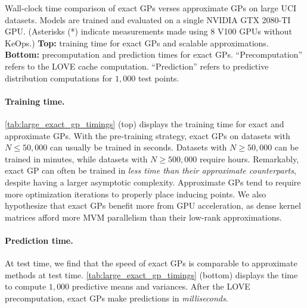 
\begin{table}[t!]
  \vspace{1em}
  \caption[Wall-clock time of exact GPs verse approximate GPs.]{
    Wall-clock time comparison of exact GPs verses approximate GPs on large UCI datasets.
    Models are trained and evaluated on a single NVIDIA GTX 2080-TI GPU.
    (Asterisks (*) indicate measurements made using 8 V100 GPUs without KeOps.)
    {\bf Top:} training time for exact GPs and scalable approximations.
    {\bf Bottom:} precomputation and prediction times for exact GPs.
    ``Precomputation'' refers to the LOVE cache computation.
    ``Prediction'' refers to predictive distribution computations for $1,\!000$ test points.
  }
  \label{tab:large_exact_gp_timings}
  \centering
  \vspace{1em}

  \resizebox{\textwidth}{!}{%
    
  }
  \vspace{1em}

  \resizebox{\textwidth}{!}{%
    
  }

  \vspace{2em}
\end{table}


\paragraph{Training time.}
\cref{tab:large_exact_gp_timings} (top) displays the training time for exact and approximate GPs.
With the pre-training strategy, exact GPs on datasets with $N \leq 50,\!000$ can usually be trained in seconds.
Datasets with $N \geq 50,\!000$ can be trained in minutes, while datasets with $N \geq 500,\!000$ require hours.
Remarkably, exact GP can often be trained in \emph{less time than their approximate counterparts}, despite having a larger asymptotic complexity.
Approximate GPs tend to require more optimization iterations to properly place inducing points.
We also hypothesize that exact GPs benefit more from GPU acceleration, as dense kernel matrices afford more MVM parallelism than their low-rank approximations.

\paragraph{Prediction time.}
At test time, we find that the speed of exact GPs is comparable to approximate methods at test time.
\cref{tab:large_exact_gp_timings} (bottom) displays the time to compute $1,\!000$ predictive means and variances.
After the LOVE precomputation, exact GPs make predictions in \emph{milliseconds}.

